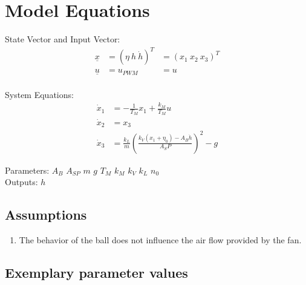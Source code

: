 \documentclass[10pt,a4paper]{article}
\begin{document}
	\section{Model Equations} %
	
	State Vector and Input Vector:
	\begin{align*}
	    \underline{x} &= (\eta \ h \ \dot{h})^T &= (x_1 \ x_2 \ x_3)^T \\
		\underline{u} &= u_{PWM} &= u \\
	\end{align*}
	
	\noindent System Equations:			
	\begin{subequations}
	\begin{align}
		\dot{x}_1 &= -\frac{1}{T_M}x_1 + \frac{k_M}{T_M}u\\
		\dot{x}_2 &= x_3 \\
		\dot{x}_3 &= \frac{k_L}{m}\left(\frac{k_V(x_1+\eta_0) - A_B\dot{h}}{A_SP}\right)^2 -g
	\end{align}
	\end{subequations}

	\noindent
	Parameters: $A_B$ $A_{SP}$ $m$ $g$ $T_M$ $k_M$ $k_V$ $k_L$ $n_0$ %
	\\
	Outputs: $h$ \\ 
	
	
	\subsection{Assumptions} %
		\begin{enumerate} %
			\item The behavior of the ball does not influence the air flow provided by the fan. 
		\end{enumerate}
	
	
	\subsection{Exemplary parameter values}
	

	
\end{document}

